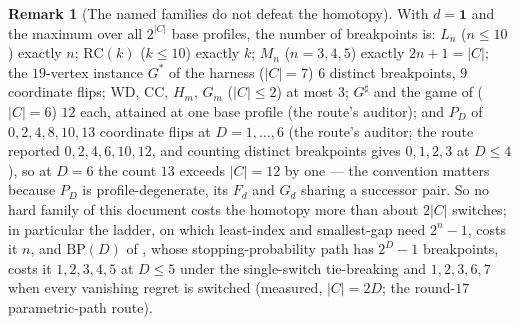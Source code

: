 \documentclass[11pt]{article}
\theoremstyle{plain}
\theoremstyle{definition}
\newtheorem{remark}[theorem]{Remark}
\newcommand{\bbone}{\mathbf{1}}
\begin{document}
\begin{remark}[The named families do not defeat the homotopy]\label{rem:bias-families}
With $d=\bbone$ and the maximum over all $2^{|C|}$ base profiles, the
number of breakpoints is: $L_n$ ($n\le10$) exactly $n$; $\mathrm{RC}(k)$
($k\le10$) exactly $k$; $M_n$ ($n=3,4,5$) exactly $2n+1=|C|$; the
$19$-vertex instance $G^{\ast}$ of the harness ($|C|=7$) $6$ distinct
breakpoints, $9$ coordinate flips;
$\mathrm{WD}$, $\mathrm{CC}$, $H_m$, $G_m$ ($|C|\le2$) at most $3$;
$G^{\sharp}$ and the game of  ($|C|=6$) $12$ each,
attained at one base profile (the route's auditor); and $P_D$ of
 $0,2,4,8,10,13$ coordinate flips at $D=1,\dots,6$ (the
route's auditor; the route reported $0,2,4,6,10,12$, and counting
distinct breakpoints gives $0,1,2,3$ at $D\le4$), so at $D=6$ the count
$13$ exceeds $|C|=12$ by one --- the convention matters because $P_D$ is
profile-degenerate, its $F_d$ and $G_d$ sharing a successor pair. So no
hard family of this document costs the homotopy more than about $2|C|$
switches; in particular the ladder, on which least-index and
smallest-gap need $2^{n}-1$, costs it $n$, and $\mathrm{BP}(D)$ of
, whose stopping-probability path has $2^{D}-1$
breakpoints, costs it $1,2,3,4,5$ at $D\le5$ under the single-switch
tie-breaking and $1,2,3,6,7$ when every vanishing regret is switched
(measured, $|C|=2D$; the round-$17$ parametric-path route).
\end{remark}
\end{document}

